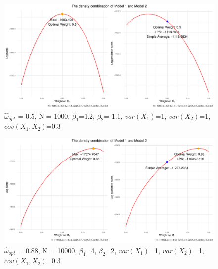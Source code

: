 \begin{frame}[plain]
    \begin{figure}
        \centering
        \includegraphics[scale=0.55]{Graph/LPS_1000.pdf}
        \caption{\footnotesize{\alert{$\hat\omega_{opt}$ = 0.5}, N = 1000, \alert{$\beta_1$=1.2}, \alert{$\beta_2$=-1.1}, $var(X_1)$=1, $var(X_2)$=1, $cov(X_1,X_2)$=0.3}}
    \end{figure}
\end{frame}



\begin{frame}[plain]
    \begin{figure}
        \centering
        \includegraphics[scale=0.55]{Graph/LPS_1.pdf}
        \caption{\footnotesize{\alert{$\hat\omega_{opt}$ = 0.88}, N = 10000, \alert{$\beta_1$=4}, \alert{$\beta_2$=2}, $var(X_1)$=1, $var(X_2)$=1, $cov(X_1,X_2)$=0.3}}
    \end{figure}
\end{frame}



